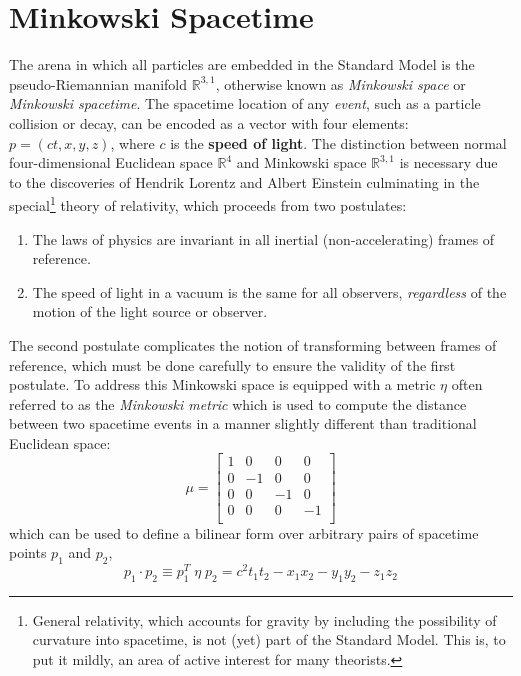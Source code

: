 \section{Minkowski Spacetime}
\newcommand{\MinkSpace}{\ensuremath{\mathbb{R}^{3,1}}\xspace}
The arena in which all particles are embedded in the Standard Model is the pseudo-Riemannian manifold \MinkSpace, otherwise known as \textit{Minkowski space} or \textit{Minkowski spacetime}.
The spacetime location of any \textit{event}, such as a particle collision or decay, can be encoded as a vector with four elements: $p = (ct, x, y, z)$, where $c$ is the \textbf{speed of light}.
The distinction between normal four-dimensional Euclidean space $\mathbb{R}^4$ and Minkowski space \MinkSpace is necessary due to the discoveries of Hendrik Lorentz and Albert Einstein culminating in the special\footnote{General relativity, which accounts for gravity by including the possibility of curvature into spacetime, is not (yet) part of the Standard Model. This is, to put it mildly, an area of active interest for many theorists.} theory of relativity, which proceeds from two postulates:
\begin{enumerate}
    \item The laws of physics are invariant in all inertial (non-accelerating) frames of reference.
    \item The speed of light in a vacuum is the same for all observers, \textit{regardless} of the motion of the light source or observer.
\end{enumerate}

The second postulate complicates the notion of transforming between frames of reference, which must be done carefully to ensure the validity of the first postulate.
To address this Minkowski space is equipped with a metric $\eta$ often referred to as the \textit{Minkowski metric} which is used to compute the distance between two spacetime events in a manner slightly different than traditional Euclidean space:
\begin{equation}
\mu =
\begin{bmatrix} 
1 & 0 & 0 & 0\\
0 & -1 & 0 & 0\\
0 & 0 & -1 & 0\\
0 & 0 & 0 & -1\\
\end{bmatrix}
\end{equation}
which can be used to define a bilinear form over arbitrary pairs of spacetime points $p_1$ and $p_2$,
\begin{equation}
p_1 \cdot p_2 \equiv p_1^T\; \eta\; p_2 = c^2t_1t_2 - x_1x_2 - y_1y_2 - z_1z_2
\end{equation}

